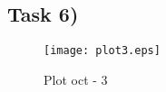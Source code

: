 \subsection{Task 6)}
\label{subsec:task6_a}

\begin{figure}[ht]
	\centering
	\texttt{[image: plot3.eps]}
	\caption{Plot oct - 3}
\label{fig:Dsnh_sim_t2}
\end{figure}



